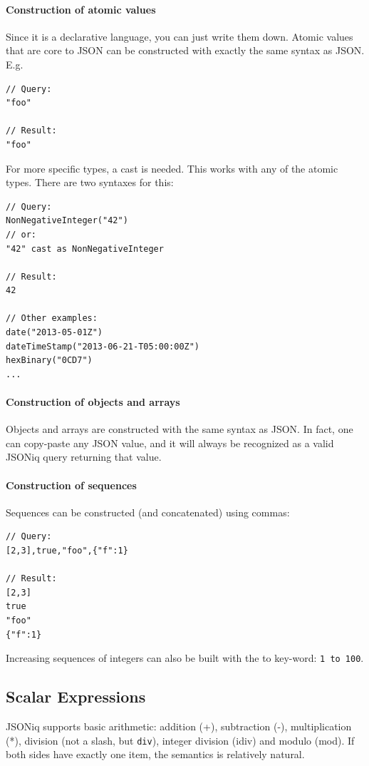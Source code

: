 \paragraph{Construction of atomic values}

Since it is a declarative language, you can just write them down. Atomic values that are core to JSON can be constructed with exactly the same syntax as JSON. E.g.

\begin{lstlisting}[style=json]
// Query:
"foo"

// Result:
"foo"
\end{lstlisting}

For more specific types, a cast is needed. This works with any of the atomic types. There are two syntaxes for this:

\begin{lstlisting}[style=json]
// Query:
NonNegativeInteger("42")
// or:
"42" cast as NonNegativeInteger

// Result:
42

// Other examples:
date("2013-05-01Z")
dateTimeStamp("2013-06-21-T05:00:00Z")
hexBinary("0CD7")
...
\end{lstlisting}

\paragraph{Construction of objects and arrays}
Objects and arrays are constructed with the same syntax as JSON. In fact, one can copy-paste any JSON value, and it will always be recognized as a valid JSONiq query returning that value.

\paragraph{Construction of sequences}
Sequences can be constructed (and concatenated) using commas:

\begin{lstlisting}[style=json]
// Query:
[2,3],true,"foo",{"f":1}

// Result:
[2,3]
true
"foo"
{"f":1}
\end{lstlisting}

Increasing sequences of integers can also be built with the to key-word: \texttt{1 to 100}.


\subsection{Scalar Expressions}
JSONiq supports basic arithmetic: addition (+), subtraction (-), multiplication (*), division (not a slash, but \texttt{div}), integer division (idiv) and modulo (mod). If both sides have exactly one item, the semantics is relatively natural.

